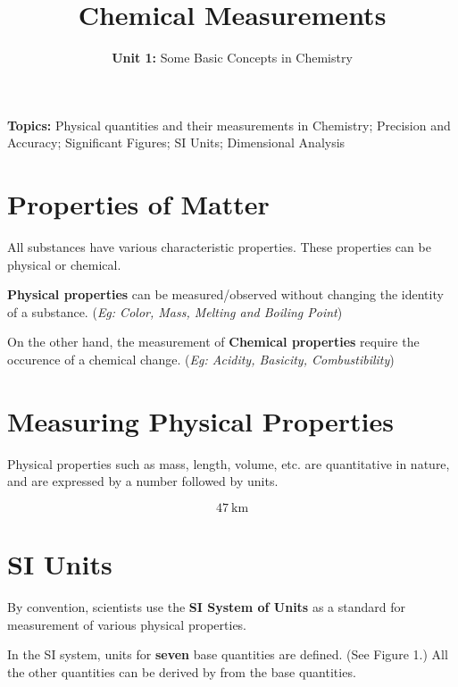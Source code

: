 \documentclass[
  14pt,
]{extarticle}
\title{\textbf{Chemical Measurements}}
\subtitle{\textbf{Unit 1:} Some Basic Concepts in Chemistry}
\author{}
\date{}
\renewenvironment{quote}{\begin{myquote}}{\end{myquote}}
\begin{document}
\maketitle
\thispagestyle{fancy}

\begin{quote}
\textbf{Topics:} Physical quantities and their measurements in
Chemistry; Precision and Accuracy; Significant Figures; SI Units;
Dimensional Analysis
\end{quote}

\hypertarget{properties-of-matter}{%
\section{Properties of Matter}\label{properties-of-matter}}

All substances have various characteristic properties. These properties
can be physical or chemical.

\textbf{Physical properties} can be measured/observed without changing
the identity of a substance. (\emph{Eg: Color, Mass, Melting and Boiling
Point})

On the other hand, the measurement of \textbf{Chemical properties}
require the occurence of a chemical change. (\emph{Eg: Acidity,
Basicity, Combustibility})

\hypertarget{measuring-physical-properties}{%
\section{Measuring Physical
Properties}\label{measuring-physical-properties}}

Physical properties such as mass, length, volume, etc. are quantitative
in nature, and are expressed by a number followed by units.

\[{47~\mathrm{km}}\]

\hypertarget{si-units}{%
\section{SI Units}\label{si-units}}

By convention, scientists use the \textbf{SI System of Units} as a
standard for measurement of various physical properties.

In the SI system, units for \textbf{seven} base quantities are defined.
(See Figure 1.) All the other quantities can be derived by from the base
quantities.
\end{document}
